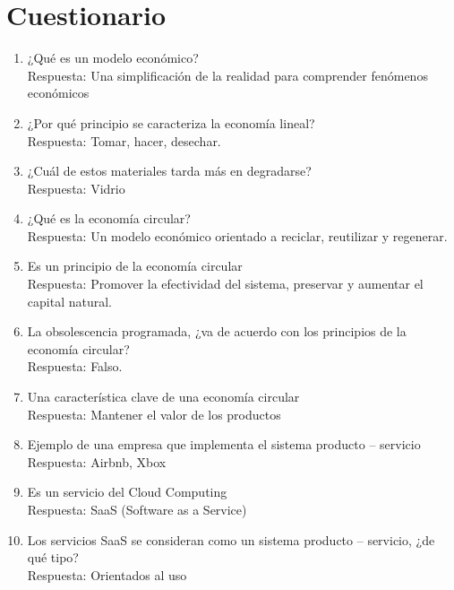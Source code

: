 \documentclass[a4paper,12pt]{article}
\begin{document}
\section*{Cuestionario}
\begin{enumerate}



\item ¿Qué es un modelo económico? \\
Respuesta: Una simplificación de la realidad para comprender fenómenos económicos
\item ¿Por qué principio se caracteriza la economía lineal? \\
Respuesta: Tomar, hacer, desechar.
\item ¿Cuál de estos materiales tarda más en degradarse?\\
Respuesta: Vidrio
\item ¿Qué es la economía circular?\\
Respuesta: Un modelo económico orientado a reciclar, reutilizar y regenerar.
\item Es un principio de la economía circular\\
	Respuesta: Promover la efectividad del sistema, preservar y aumentar el capital natural.
\item La obsolescencia programada, ¿va de acuerdo con los principios de la economía circular? \\
Respuesta: Falso.
\item Una característica clave de una economía circular
\\ Respuesta: Mantener el valor de los productos
\item Ejemplo de una empresa que implementa el sistema producto – servicio
\\ Respuesta: Airbnb, Xbox
\item Es un servicio del Cloud Computing
\\ Respuesta: SaaS (Software as a Service)
\item Los servicios SaaS se consideran como un sistema producto – servicio, ¿de qué tipo?
\\ Respuesta: Orientados al uso

\end{enumerate}


\newpage
\end{document}
